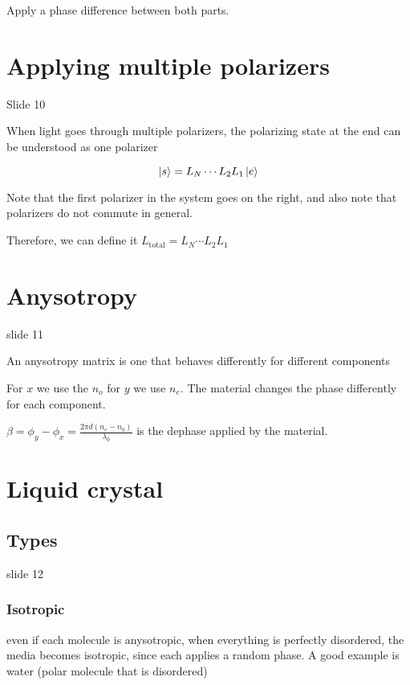 \documentclass[../main/main.tex]{subfiles}
\begin{document}
Apply a phase difference between both parts.

\section{Applying multiple polarizers}

Slide 10

When light goes through multiple polarizers, the polarizing state at the end can be understood as one polarizer

\begin{equation}
	\ket{s}  = L_N \cdots L_2 L_1 \ket{e}
\end{equation}

Note that the first polarizer in the system goes on the right, and also note that polarizers do not commute in general.

Therefore, we can define it $L_{\textrm{total}} = L_N \cdots L_2 L_1$


\section{Anysotropy}

slide 11

An anysotropy matrix is one that behaves differently for different components

For $x$ we use the $n_o$ for $y$ we use $n_e$. The material changes the phase differently for each component.

$\beta = \phi_y - \phi_x = \frac{2 \pi d (n_e - n_0)}{\lambda_0}$ is the dephase applied by the material.


\section{Liquid crystal}

\subsection{Types}

slide 12

\subsubsection{Isotropic}

even if each molecule is anysotropic, when everything is perfectly disordered, the media becomes isotropic, since each applies a random phase. A good example is water (polar molecule that is disordered)
\end{document}
